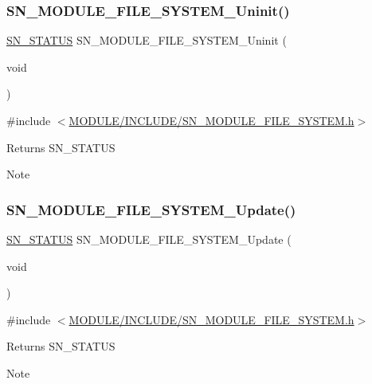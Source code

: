 \subsubsection{\texorpdfstring{S\+N\+\_\+\+M\+O\+D\+U\+L\+E\+\_\+\+F\+I\+L\+E\+\_\+\+S\+Y\+S\+T\+E\+M\+\_\+\+Uninit()}{SN\_MODULE\_FILE\_SYSTEM\_Uninit()}}
{\footnotesize\ttfamily \hyperlink{group__SYSTEM__ERROR_ga4540713b9a7a18ce44d78c3a10f7442f}{S\+N\+\_\+\+S\+T\+A\+T\+US} S\+N\+\_\+\+M\+O\+D\+U\+L\+E\+\_\+\+F\+I\+L\+E\+\_\+\+S\+Y\+S\+T\+E\+M\+\_\+\+Uninit (\begin{DoxyParamCaption}\item[{void}]{ }\end{DoxyParamCaption})}



{\ttfamily \#include $<$\hyperlink{SN__MODULE__FILE__SYSTEM_8h}{M\+O\+D\+U\+L\+E/\+I\+N\+C\+L\+U\+D\+E/\+S\+N\+\_\+\+M\+O\+D\+U\+L\+E\+\_\+\+F\+I\+L\+E\+\_\+\+S\+Y\+S\+T\+E\+M.\+h}$>$}

\begin{DoxyReturn}{Returns}
S\+N\+\_\+\+S\+T\+A\+T\+US 
\end{DoxyReturn}
\begin{DoxyNote}{Note}

\end{DoxyNote}
\mbox{\label{group__MODULE__FILE__SYSTEM_ga7df4490475224028341c54f5d5db5736}} 
\subsubsection{\texorpdfstring{S\+N\+\_\+\+M\+O\+D\+U\+L\+E\+\_\+\+F\+I\+L\+E\+\_\+\+S\+Y\+S\+T\+E\+M\+\_\+\+Update()}{SN\_MODULE\_FILE\_SYSTEM\_Update()}}
{\footnotesize\ttfamily \hyperlink{group__SYSTEM__ERROR_ga4540713b9a7a18ce44d78c3a10f7442f}{S\+N\+\_\+\+S\+T\+A\+T\+US} S\+N\+\_\+\+M\+O\+D\+U\+L\+E\+\_\+\+F\+I\+L\+E\+\_\+\+S\+Y\+S\+T\+E\+M\+\_\+\+Update (\begin{DoxyParamCaption}\item[{void}]{ }\end{DoxyParamCaption})}



{\ttfamily \#include $<$\hyperlink{SN__MODULE__FILE__SYSTEM_8h}{M\+O\+D\+U\+L\+E/\+I\+N\+C\+L\+U\+D\+E/\+S\+N\+\_\+\+M\+O\+D\+U\+L\+E\+\_\+\+F\+I\+L\+E\+\_\+\+S\+Y\+S\+T\+E\+M.\+h}$>$}

\begin{DoxyReturn}{Returns}
S\+N\+\_\+\+S\+T\+A\+T\+US 
\end{DoxyReturn}
\begin{DoxyNote}{Note}

\end{DoxyNote}
